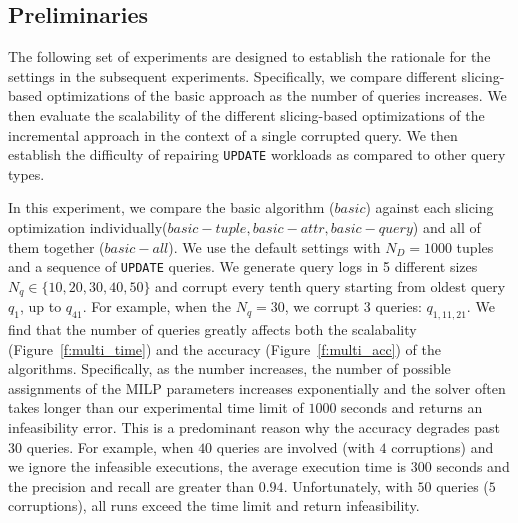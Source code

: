 \subsection{Preliminaries}
The following set of experiments are designed to establish the rationale for 
the settings in the subsequent experiments.  
Specifically, we compare different slicing-based optimizations of the basic approach
as the number of queries increases.  
We then evaluate the scalability of the different slicing-based optimizations of the 
incremental approach in the context of a single
corrupted query. We then establish the difficulty of repairing \texttt{UPDATE} 
workloads as compared to other query types. 

In this experiment, we compare the basic algorithm ($basic$) against 
each slicing optimization individually($basic-tuple, basic-attr, basic-query$) and all of them together ($basic-all$).  
We use the default settings with $N_D = 1000$ tuples and a sequence of \texttt{UPDATE} queries.
We generate query logs in 5 different sizes $N_q\in \{10, 20, 30, 40, 50\}$ and corrupt 
every tenth query starting from oldest query $q_1$,
up to $q_{41}$.  For example, when the $N_q = {30}$, we corrupt 3 queries: $q_{1,11,21}$. 
We find that the number of queries greatly affects both the scalabality (Figure~\ref{f:multi_time}) 
and the accuracy (Figure~\ref{f:multi_acc}) of the algorithms. Specifically, as the number increases,
the number of possible assignments of the MILP parameters increases exponentially and the solver often takes
longer than our experimental time limit of $1000$ seconds and returns an infeasibility error.  
This is a predominant reason why the accuracy degrades past $30$ queries.  For example, 
when $40$ queries are involved (with $4$ corruptions) 
and we ignore the infeasible executions, the average execution time is $300$ seconds
and the precision and recall are greater than $0.94$.  Unfortunately, with $50$ queries ($5$ corruptions),
all runs exceed the time limit and return infeasibility.

